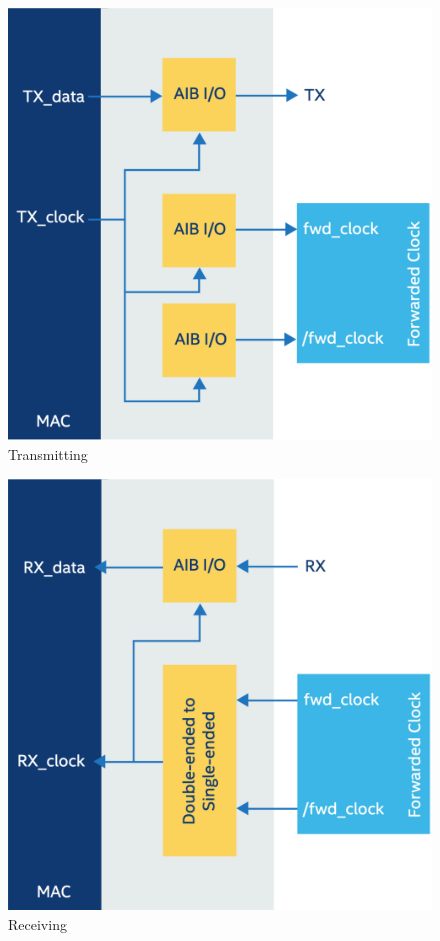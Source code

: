 \documentclass[../main.tex]{subfiles}
\begin{document}
\begin{figure}
    \centering
    \includegraphics[scale=.16]{pngs/AIB-Tx.png}
    \caption{Transmitting\cite{AIBWhitePaper}}
    \label{fig:AIB-Tx}
\end{figure}

\begin{figure}
    \centering
    \includegraphics[scale=.16]{pngs/AIB-Rx.png}
    \caption{Receiving\cite{AIBWhitePaper}}
    \label{fig:AIB-Rx}
\end{figure}
\end{document}
